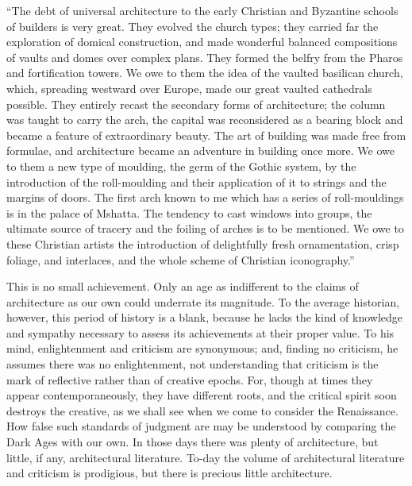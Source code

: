 \documentclass{book}
\begin{document}
“The debt of universal architecture to the early Christian and Byzantine schools of builders is very great. They evolved the church types; they carried far the exploration of domical construction, and made wonderful balanced compositions of vaults and domes over complex plans. They formed the belfry from the Pharos and fortification towers. We owe to them the idea of the vaulted basilican church, which, spreading westward over Europe, made our great vaulted cathedrals possible. They entirely recast the secondary forms of architecture; the column was taught to carry the arch, the capital was reconsidered as a bearing block and became a feature of extraordinary beauty. The art of building was made free from formulae, and architecture became an adventure in building once more. We owe to them a new type of moulding, the germ of the Gothic system, by the introduction of the roll-moulding and their application of it to strings and the margins of doors. The first arch known to me which has a series of roll-mouldings is in the palace of Mshatta. The tendency to cast windows into groups, the ultimate source of tracery and the foiling of arches is to be mentioned. We owe to these Christian artists the introduction of delightfully fresh ornamentation, crisp foliage, and interlaces, and the whole scheme of Christian iconography.”\footnotemark[4]

This is no small achievement. Only an age as indifferent to the claims of architecture as our own could underrate its magnitude. To the average historian, however, this period of history is a blank, because he lacks the kind of knowledge and sympathy necessary to assess its achievements at their proper value. To his mind, enlightenment and criticism are synonymous; and, finding no criticism, he assumes there was no enlightenment, not understanding that criticism is the mark of reflective rather than of creative epochs. For, though at times they appear contemporaneously, they have different roots, and the critical spirit soon destroys the creative, as we shall see when we come to consider the Renaissance. How false such standards of judgment are may be understood by comparing the Dark Ages with our own. In those days there was plenty of architecture, but little, if any, architectural literature. To-day the volume of architectural literature and criticism is prodigious, but there is precious little architecture.
\end{document}
